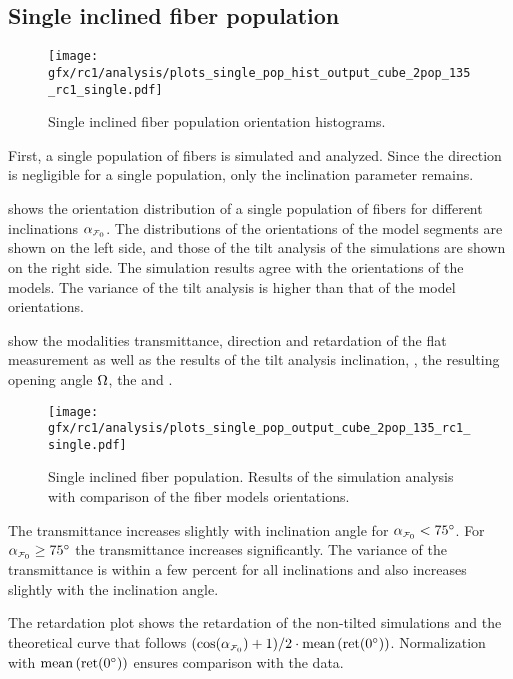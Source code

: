 \subsection{Single inclined fiber population}
\label{sec:resSingleIncl}
%
\begin{figure}[!t]
\centering
\texttt{[image: gfx/rc1/analysis/plots\_single\_pop\_hist\_output\_cube\_2pop\_135\_rc1\_single.pdf]}
\caption{Single inclined fiber population orientation histograms.}
\label{fig:single_fiber_pop_hist}
\end{figure}
%
First, a single population of fibers is simulated and analyzed.
Since the direction is negligible for a single population, only the inclination parameter \modelInc{} remains.
\par
%
 shows the orientation distribution of a single population of fibers for different inclinations $\modelInc{}$.
The distributions of the orientations of the model segments are shown on the left side, and those of the tilt analysis of the simulations are shown on the right side.
The simulation results agree with the orientations of the models.
The variance of the tilt analysis is higher than that of the model orientations.
\par
%
 show the modalities transmittance, direction and retardation of the flat measurement as well as the results of the tilt analysis inclination, \trel{}, the resulting opening angle $\textnormal{$\Omega$}$, the \accvalue{} and \rvalue{}.
% 
\begin{figure}[!p]
    \centering
    \texttt{[image: gfx/rc1/analysis/plots\_single\_pop\_output\_cube\_2pop\_135\_rc1\_single.pdf]}
    \caption{Single inclined fiber population. Results of the simulation analysis with comparison of the fiber models orientations.}
    \label{fig:single_fiber_pop_rofl}
\end{figure}
% 
The transmittance increases slightly with inclination angle for $\modelInc<\SI{75}{\degree}$.
For $\modelInc \ge \SI{75}{\degree}$ the transmittance increases significantly.
The variance of the transmittance is within a few percent for all inclinations and also increases slightly with the inclination angle.
\par
%
The retardation plot shows the retardation of the non-tilted simulations and the theoretical curve that follows $(\cos(\modelInc) + 1) / 2 \cdot \mean\left(\mathrm{ret}(\SI{0}{\degree})\right)$.
Normalization with $\operatorname{mean}\left(\mathrm{ret}(\SI{0}{\degree})\right)$ ensures comparison with the data.
